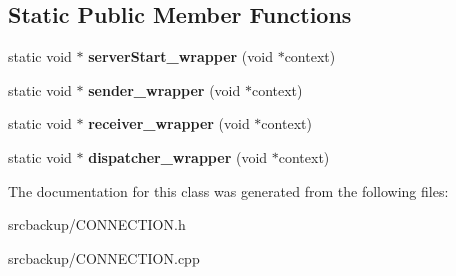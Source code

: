 \subsection*{Static Public Member Functions}
\begin{DoxyCompactItemize}
\item 
\hypertarget{classCONNECTION_a539285f4c0510d43c6e62346c71fdf44}{}static void $\ast$ {\bfseries server\+Start\+\_\+wrapper} (void $\ast$context)\label{classCONNECTION_a539285f4c0510d43c6e62346c71fdf44}

\item 
\hypertarget{classCONNECTION_a00c2ac9ec4f67ab68ea2c3cae144456e}{}static void $\ast$ {\bfseries sender\+\_\+wrapper} (void $\ast$context)\label{classCONNECTION_a00c2ac9ec4f67ab68ea2c3cae144456e}

\item 
\hypertarget{classCONNECTION_a11682523fefd227c06ff2a9b87f156cd}{}static void $\ast$ {\bfseries receiver\+\_\+wrapper} (void $\ast$context)\label{classCONNECTION_a11682523fefd227c06ff2a9b87f156cd}

\item 
\hypertarget{classCONNECTION_a6ef84a111db27456fa1b6390f5c5e5f0}{}static void $\ast$ {\bfseries dispatcher\+\_\+wrapper} (void $\ast$context)\label{classCONNECTION_a6ef84a111db27456fa1b6390f5c5e5f0}

\end{DoxyCompactItemize}


The documentation for this class was generated from the following files\+:\begin{DoxyCompactItemize}
\item 
srcbackup/C\+O\+N\+N\+E\+C\+T\+I\+O\+N.\+h\item 
srcbackup/C\+O\+N\+N\+E\+C\+T\+I\+O\+N.\+cpp\end{DoxyCompactItemize}
